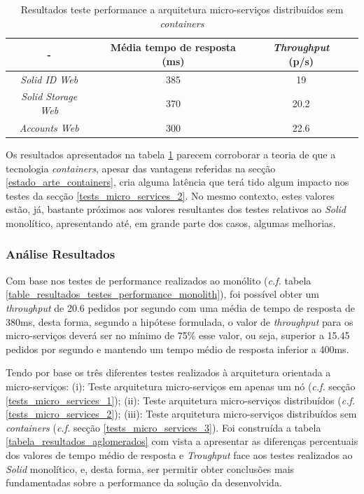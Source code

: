 \begin{table}[h]
\centering
\caption{Resultados teste performance a arquitetura micro-serviços distribuídos sem \emph{containers}}
\label{r_t_m_s_3}
\vspace{0.5cm}
\begin{tabular}{c|c|c|c} 
 - & Média tempo de resposta (ms) & \emph{Throughput} (p/s) \\
\hline                          
\emph{Solid ID Web} & 385 & 19 \\
\emph{Solid Storage Web} & 370 & 20.2 \\
\emph{Accounts Web} & 300 & 22.6 \\
\end{tabular}
\end{table}

Os resultados apresentados na tabela \ref{r_t_m_s_3} parecem corroborar a teoria de que a tecnologia \emph{containers}, apesar das vantagens referidas na secção \ref{estado_arte_containers}, cria alguma latência que terá tido algum impacto nos testes da secção \ref{tests_micro_services_2}. No mesmo contexto, estes valores estão, já, bastante próximos aos valores resultantes dos testes relativos ao \emph{Solid} monolítico, apresentando até, em grande parte dos casos, algumas melhorias.

\subsubsection{Análise Resultados}
Com base nos testes de performance realizados ao monólito (\emph{c.f.} tabela \ref{table_resultados_testes_performance_monolith}), foi possível obter um \emph{throughput} de 20.6 pedidos por segundo com uma média de tempo de resposta de 380ms, desta forma, segundo a hipótese formulada, o valor de \emph{throughput} para os micro-serviços deverá ser no mínimo de 75\% esse valor, ou seja, superior a 15.45 pedidos por segundo e mantendo um tempo médio de resposta inferior a 400ms.

Tendo por base os três diferentes testes realizados à arquitetura orientada a micro-serviços: (i): Teste arquitetura micro-serviços em apenas um nó (\emph{c.f.} secção \ref{tests_micro_services_1}); (ii): Teste arquitetura micro-serviços distribuídos (\emph{c.f.}\ref{tests_micro_services_2}); (iii): Teste arquitetura micro-serviços distribuídos sem \emph{containers} (\emph{c.f.} secção \ref{tests_micro_services_3}).
Foi construída a tabela \ref{tabela_resultados_aglomerados} com vista a apresentar as diferenças percentuais dos valores de tempo médio de resposta e \emph{Troughput} face aos testes realizados ao \emph{Solid} monolítico, e, desta forma, ser permitir obter conclusões mais fundamentadas sobre a performance da solução da desenvolvida.

